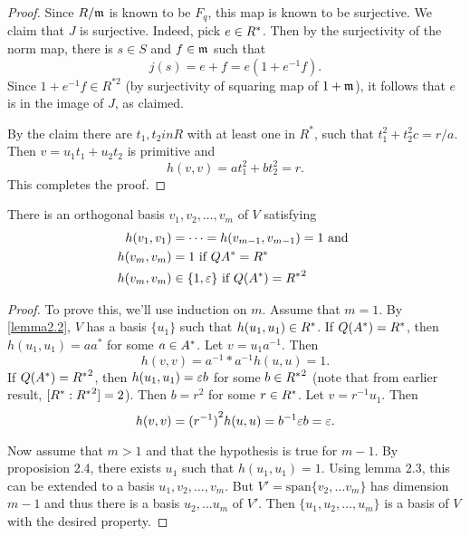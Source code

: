 \begin{proof}
Since $R/\mathfrak{m}$ is known to be $F_q$, this map is known to be surjective.
We claim that $J$ is surjective.
Indeed, pick $e \in R^*$.
Then by the surjectivity of the norm map, there is $s \in S$ and $f \in \mathfrak{m}$ such that
\[
j(s) = e + f = e(1 + e^{-1}f).
\]
Since $1 + e^{-1} f \in R^{*2}$ (by surjectivity of squaring map of $1 + \mathfrak{m}$), it follows that $e$ is in the image of $J$, as claimed.

By the claim there are $t_1, t_2 in R$ with at least one in $R^*$, such that $t_1^2 + t_2^2 c = r/a$.
Then $v = u_1 t_1 + u_2 t_2$ is primitive and
\[
h(v,v) = at_1^2 + bt_2^2 = r.
\]
This completes the proof.
\end{proof}

\begin{theorem}\label{theorem3.5}
There is an orthogonal basis $v_1, v_2, \dotsc, v_m$ of $V$ satisfying
\begin{align*}
  h(v_1, v_1) &= \dotsb = h(v_{m-1}, v_{m-1}) = 1 \text{ and } \\
  h(v_m, v_m) &= 1 \text{ if } Q{A^*} = R^* \\
  h(v_m, v_m) &\in \{1, \varepsilon \} \text{ if } Q(A^*) = {R^*}^2
\end{align*}
\end{theorem}

\begin{proof}
To prove this, we'll use induction on $m$.
Assume that $m = 1$. By \cref{lemma2.2}, $V$ has a basis $\{u_1\}$ such that $h(u_1, u_1) \in R^*$.
If $Q(A^*) = R^*$, then $h(u_1, u_1) = a a^*$ for some $a \in A^*$.
Let $v = u_1 a^{-1}$.
Then
\[
h(v, v) = {a^{-1}}* a^{-1} h(u, u) = 1.
\]
If $Q(A^*) = {R^*}^2$, then $h(u_1, u_1) = \varepsilon b$ for some $b \in {R^*}^2$ (note that from earlier result, $[R^* : {R^*}^2] = 2$).
Then $b = r^2$ for some $r \in R^*$.
Let $v = r^{-1} u_1$. Then
\[
h(v, v) = {(r^{-1})}^2 h(u, u) = b^{-1} \varepsilon b = \varepsilon.
\]

Now assume that $m > 1$ and that the hypothesis is true for $m - 1$.
By proposision 2.4, there exists $u_1$ such that $h(u_1, u_1) = 1$.
Using lemma 2.3, this can be extended to a basis $u_1, v_2, \dotsc, v_m$.
But $V' = \text{span} \{v_2, \dotsc v_m\}$ has dimension $m - 1$ and thus there is a basis $u_2, \dotsc u_m$ of $V'$.
Then $\{u_1, u_2, \dotsc, u_m \}$ is a basis of $V$ with the desired property.
\end{proof}

